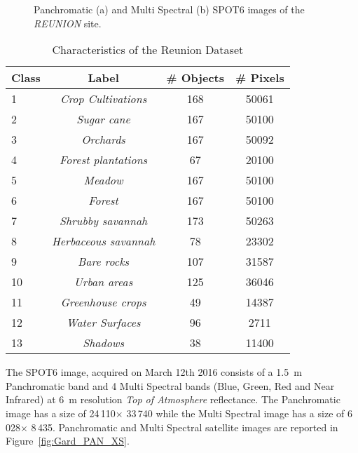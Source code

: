 \documentclass[journal]{IEEEtran}
\begin{document}
\begin{figure}[!ht]
\centering
{}
\caption{ Panchromatic (a) and Multi Spectral (b) SPOT6 images of the \textit{REUNION} site. \label{fig:Reunion_PAN_XS} }
\end{figure}\begin{table}[!ht]
\centering
\begin{tabular}{|l||c|c|c|}
	\hline
\textbf{Class} & Label & \# \textbf{Objects} & \# \textbf{Pixels} \\ 
\hline \hline
1 & {\em Crop Cultivations} & 168 & 50061 \\ \hline
2 & {\em Sugar cane} & 167 & 50100  \\ \hline
3 & {\em Orchards} & 167 & 50092 \\ \hline
4 & {\em Forest plantations} & 67 & 20100 \\ \hline
5 & {\em Meadow} & 167 & 50100 \\ \hline
6 & {\em Forest} & 167 & 50100 \\ \hline
7 & {\em Shrubby savannah} & 173 & 50263 \\ \hline
8 & {\em Herbaceous savannah} & 78 & 23302 \\ \hline
9 & {\em Bare rocks} & 107 & 31587 \\ \hline
10 & {\em Urban areas} & 125 & 36046 \\ \hline
11 & {\em Greenhouse crops}& 49 & 14387 \\ \hline
12 & {\em Water Surfaces} & 96 &  2711\\ \hline
13 & {\em Shadows} & 38 & 11400 \\ \hline
\end{tabular}
\caption{Characteristics of the Reunion Dataset\label{tab:data_reu}}
\end{table}%

The SPOT6 image, acquired on March 12th 2016 consists of a 1.5~m Panchromatic band and 4 Multi Spectral bands (Blue, Green, Red and Near Infrared) at 6~m resolution \textit{Top of Atmosphere} reflectance.
The Panchromatic image has a size of 24\,110$\times$ 33\,740 while the Multi Spectral image has a size of 
6\,028$\times$ 8\,435. Panchromatic and Multi Spectral satellite images are reported in Figure~\ref{fig:Gard_PAN_XS}.
\end{document}
